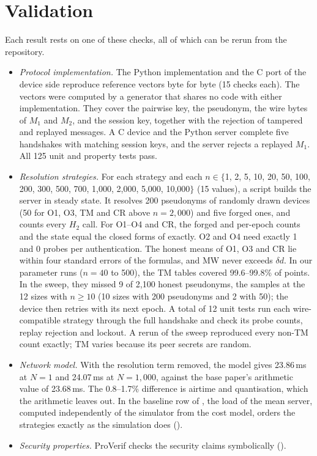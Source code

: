 \section{Validation}\label{sec:validation}
Each result rests on one of these checks, all of which can be rerun from the repository.
\begin{itemize}
\item \emph{Protocol implementation.} The Python implementation and the C port of the device side reproduce reference
vectors byte for byte (15 checks each). The vectors were computed by a generator that shares no code with either
implementation. They cover the pairwise key, the pseudonym, the wire bytes of $M_1$ and $M_2$, and the session key,
together with the rejection of tampered and replayed messages. A C device and the Python server complete five handshakes
with matching session keys, and the server rejects a replayed $M_1$. All 125 unit and property tests pass.
\item \emph{Resolution strategies.} For each strategy and each
$n\in\{$1, 2, 5, 10, 20, 50, 100, 200, 300, 500, 700, 1{,}000, 2{,}000, 5{,}000, 10{,}000$\}$ (15 values), a script builds the server in
steady state. It resolves 200 pseudonyms of randomly drawn devices (50 for O1, O3, TM and CR above $n=2{,}000$) and five
forged ones, and counts every $H_2$ call. For O1--O4 and CR, the forged and per-epoch counts and the state equal the closed
forms of \designref exactly. O2 and O4 need exactly 1 and 0 probes per authentication. The honest means of O1, O3
and CR lie within four standard errors of the formulas, and MW never exceeds $\delta d$. In our parameter runs ($n=40$ to
500), the TM tables covered 99.6--99.8\% of points. In the sweep, they missed 9 of 2{,}100 honest pseudonyms, the samples
at the 12 sizes with $n\ge10$ (10 sizes with 200 pseudonyms and 2 with 50); the device then retries with its next epoch.
A total of 12 unit tests run each wire-compatible strategy through the full handshake and check its probe counts, replay rejection and
lockout. A rerun of the sweep reproduced every non-TM count exactly; TM varies because its peer secrets are random.
\item \emph{Network model.} With the resolution term removed, the model gives 23.86\,ms at $N=1$ and 24.07\,ms at
$N=1{,}000$, against the base paper's arithmetic value of 23.68\,ms. The 0.8--1.7\% difference is airtime and
quantisation, which the arithmetic leaves out. In the baseline row of , the load of the mean server,
computed independently of the simulator from the cost model, orders the strategies exactly as the simulation does
().
\iffv
\ifshortpaper\else
\item \emph{Security properties.} ProVerif checks the security claims symbolically ().
\fi
\fi
\end{itemize}


